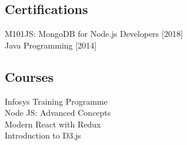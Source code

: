 \documentclass[]{deedy-resume-openfont}
\begin{document}
\begin{minipage}[t]{0.25\textwidth}

\subsection{Certifications}
\textbullet{} M101JS: MongoDB for Node.js Developers [2018]\\
\textbullet{} Java Programming [2014]
\sectionsep

\subsection{Courses}
\textbullet{} Infosys Training Programme\\
\textbullet{} Node JS: Advanced Concepts\\
\textbullet{} Modern React with Redux\\
\textbullet{} Introduction to D3.js\\
\sectionsep


%
%

\end{minipage} 
\hfill
\end{document}
